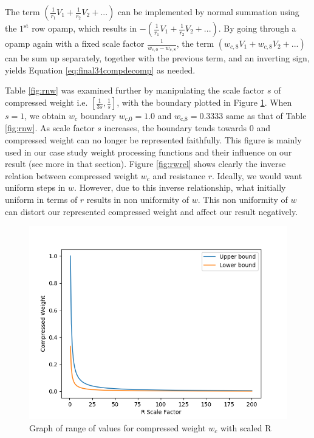 The term $\left(\frac{1}{r_1}V_1+\frac{1}{r_2}V_2+... \right)$ can be implemented by normal summation using the $\text{1}^{\text{st}}$ row opamp, which results in $-\left(\frac{1}{r_1}V_1+\frac{1}{r_2}V_2+... \right)$. By going through a opamp again with a fixed scale factor $\frac{1}{w_{c,0}-w_{c,8}}$, the term $\left(w_{c,8}V_1+w_{c,8}V_2+... \right)$ can be sum up separately, together with the previous term, and an inverting sign, yields Equation \ref{eq:final34compdecomp} as needed.

Table \ref{fig:rnw} was examined further by manipulating the scale factor $s$ of compressed weight i.e. $\left[ \frac{1}{3s},\frac{1}{s}\right]$, with the boundary plotted in Figure \ref{fig:scaledr}. When $s=1$, we obtain $w_c$ boundary $w_{\text{c,0}}=1.0$ and $w_{\text{c,8}}=0.3333$ same as that of Table \ref{fig:rnw}. As scale factor $s$ increases, the boundary tends towards 0 and compressed weight can no longer be represented faithfully. This figure is mainly used in our case study weight processing functions and their influence on our result (see more in that section). Figure \ref{fig:rwrel} shows clearly the inverse relation between compressed weight $w_c$ and resistance $r$. Ideally, we would want uniform steps in $w$. However, due to this inverse relationship, what initially uniform in terms of $r$ results in non uniformity of $w$. This non uniformity of $w$ can distort our represented compressed weight and affect our result negatively.
\begin{figure}[H]
	\centering
	\includegraphics[scale=0.6]{scaledr.png}
	\caption{Graph of range of values for compressed weight $w_c$ with scaled R}
	\label{fig:scaledr}
\end{figure}
